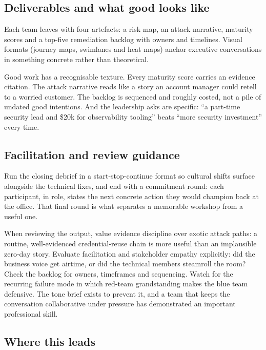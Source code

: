 \subsection{Deliverables and what good looks like}


Each team leaves with four artefacts: a risk map, an attack narrative, maturity scores and a top-five remediation backlog with owners and timelines. Visual formats (journey maps, swimlanes and heat maps) anchor executive conversations in something concrete rather than theoretical.


Good work has a recognisable texture. Every maturity score carries an evidence citation. The attack narrative reads like a story an account manager could retell to a worried customer. The backlog is sequenced and roughly costed, not a pile of undated good intentions. And the leadership asks are specific: ``a part-time security lead and \$20k for observability tooling'' beats ``more security investment'' every time.



\subsection{Facilitation and review guidance}


Run the closing debrief in a start-stop-continue format so cultural shifts surface alongside the technical fixes, and end with a commitment round: each participant, in role, states the next concrete action they would champion back at the office. That final round is what separates a memorable workshop from a useful one.


When reviewing the output, value evidence discipline over exotic attack paths: a routine, well-evidenced credential-reuse chain is more useful than an implausible zero-day story. Evaluate facilitation and stakeholder empathy explicitly: did the business voice get airtime, or did the technical members steamroll the room? Check the backlog for owners, timeframes and sequencing. Watch for the recurring failure mode in which red-team grandstanding makes the blue team defensive. The tone brief exists to prevent it, and a team that keeps the conversation collaborative under pressure has demonstrated an important professional skill.



\subsection{Where this leads}


